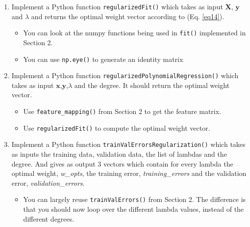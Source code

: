 \documentclass[11pt]{article}
\providecommand{\tightlist}{%
      \setlength{\itemsep}{0pt}\setlength{\parskip}{0pt}}
\begin{document}
\begin{enumerate}
\def\labelenumi{\arabic{enumi}.}
\tightlist
\item
  Implement a Python function \texttt{regularizedFit()} which takes as
  input \(\mathbf{X}\), \(\mathbf{y}\) and \(\lambda\) and returns the
  optimal weight vector according to (Eq. \ref{eq14}).

  \begin{itemize}
  \tightlist
  \item
    You can look at the numpy functions being used in \texttt{fit()}
    implemented in Section 2.
  \item
    You can use \texttt{np.eye()} to generate an identity matrix
  \end{itemize}
\item
  Implement a Python function \texttt{regularizedPolynomialRegression()}
  which takes as input \(\mathbf{x}\),\(\mathbf{y}\),\(\lambda\) and the
  degree. It should return the optimal weight vector.

  \begin{itemize}
  \tightlist
  \item
    Use \texttt{feature\_mapping()} from Section 2 to get the feature
    matrix.
  \item
    Use \texttt{regularizedFit()} to compute the optimal weight vector.
  \end{itemize}
\item
  Implement a Python function \texttt{trainValErrorsRegularization()}
  which takes as inputs the training data, validation data, the list of
  lambdas and the degree. And gives as output 3 vectors which contain
  for every lambda the optimal weight, \emph{w\_opts}, the training
  error, \emph{training\_errors} and the validation error,
  \emph{validation\_errors}.

  \begin{itemize}
  \tightlist
  \item
    You can largely reuse \texttt{trainValErrors()} from Section 2. The
    difference is that you should now loop over the different lambda
    values, instead of the different degrees.
  \end{itemize}
\end{enumerate}
\end{document}
